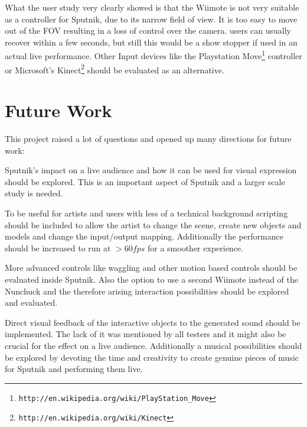 \documentclass[10pt,a4paper]{scrartcl}
\begin{document}
What the user study very clearly showed is that the Wiimote is not very suitable as a controller for Sputnik, due to its narrow field of view. It is too easy to move out of the FOV resulting in a loss of control over the camera. users can usually recover within a few seconds, but still this would be a show stopper if used in an actual live performance. Other Input devices like the Playstation Move\footnote{\texttt{http://en.wikipedia.org/wiki/PlayStation\_Move}} controller or Microsoft's Kinect\footnote{\texttt{http://en.wikipedia.org/wiki/Kinect}} should be evaluated as an alternative.


\section{Future Work}

This project raised a lot of questions and opened up many directions for future work:

Sputnik's impact on a live audience and how it can be used for visual expression should be explored. This is an important aspect of Sputnik and a larger scale study is needed.

To be useful for artists and users with less of a technical background scripting should be included to allow the artist to change the scene, create new objects and models and change the input/output mapping. Additionally the performance should be increased to run at $> 60fps$ for a smoother experience.

More advanced controls like waggling and other motion based controls should be evaluated inside Sputnik. Also the option to use a second Wiimote instead of the Nunchuck and the therefore arising interaction possibilities should be explored and evaluated.

Direct visual feedback of the interactive objects to the generated sound should be implemented. The lack of it was mentioned by all testers and it might also be crucial for the effect on a live audience. Additionally a musical possibilities should be explored by devoting the time and creativity to create genuine pieces of music for Sputnik and performing them live.
\end{document}
